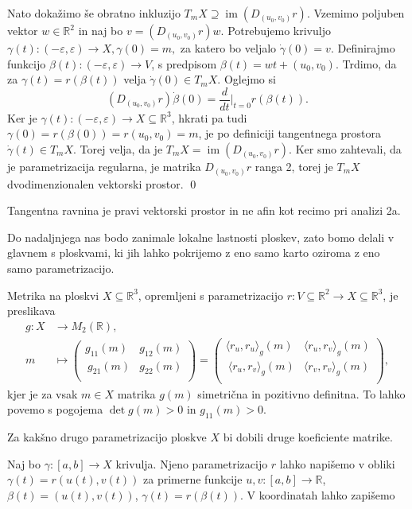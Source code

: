 Nato dokažimo še obratno inkluzijo $T_mX \supseteq
\operatorname{im} \left( D_{(u_0, v_0)}r \right)$. Vzemimo poljuben
vektor $w \in \mathbb{R}^2$ in naj bo $v = \left( D_{(u_0, v_0)} r \right) w$. Potrebujemo krivuljo $\gamma(t) : (-\varepsilon, \varepsilon) \to  X,
\gamma(0) = m,$ za katero bo veljalo $\dot{\gamma} (0) = v.$  Definirajmo funkcijo $\beta(t): (-\varepsilon, \varepsilon) \to V$,
s predpisom $\beta(t) = wt + (u_0, v_0)$. Trdimo, da za $\gamma(t) =
r(\beta(t))$  velja $\dot{\gamma}(0) \in  T_mX.$
Oglejmo si \begin{equation*} \left( D_{(u_0, v_0)}r \right)\dot{\beta} (0) =
\frac{d}{dt} \big|_{t = 0} r(\beta(t)). \end{equation*}   Ker je $\gamma(t): (-\varepsilon,
\varepsilon)\to  X \subseteq \mathbb{R}^3$, hkrati pa tudi $\gamma(0) = r(\beta(0) )= r(u_0, v_0) = m$, je po definiciji tangentnega prostora $\dot{\gamma}(t) \in T_mX$. Torej velja,
da je $T_mX = \operatorname{im}(D_{(u_0,v_0)}r)$. Ker smo zahtevali,
da je parametrizacija regularna, je matrika $D_{(u_0,v_0)}r$ ranga 2,
torej je  $T_mX$ dvodimenzionalen vektorski prostor.
\qed

\begin{opomba}
 Tangentna ravnina je pravi vektorski prostor in ne afin kot
 recimo pri analizi 2a.
\end{opomba}

Do nadaljnjega nas bodo zanimale lokalne lastnosti ploskev, zato bomo
delali v glavnem s ploskvami, ki jih lahko pokrijemo z eno samo karto
oziroma z eno samo parametrizacijo.

\begin{definicija}
\label{def_metrika_na_ploskvi}
 Metrika na ploskvi $X \subseteq  \mathbb{R}^3$, opremljeni s
 parametrizacijo $r: V \subseteq  \mathbb{R}^2 \to  X \subseteq
 \mathbb{R}^3$, je preslikava \begin{align*}
 	g: X &\longrightarrow M_2(\mathbb{R}), \\
 	m &\longmapsto 
	\begin{pmatrix}
		g_{11}(m) & g_{12}(m) \\\
		g_{21}(m) & g_{22}(m) \\
	\end{pmatrix} = \begin{pmatrix}
		\langle r_u, r_u \rangle_g (m) & \langle r_u, r_v \rangle_g(m) \\\
		\langle r_u, r_v \rangle_g(m) & \langle r_v, r_v \rangle_g(m) \\
	\end{pmatrix},
 \end{align*}
 kjer je za vsak $m \in  X$ matrika $g(m)$ simetrična in pozitivno definitna. To lahko povemo s pogojema
 $\det g(m) > 0$ in $g_{11}(m) >0.$

\end{definicija}
\begin{opomba}
 Za kakšno drugo parametrizacijo ploskve $X$ bi dobili druge koeficiente
 matrike.
\end{opomba}
 Naj bo $\gamma: [a,b] \to  X$ krivulja. Njeno parametrizacijo $r$
lahko napišemo v obliki  $\gamma(t) = r(u(t), v(t))$ za primerne
funkcije $u,v : [a,b] \to \mathbb{R}$, $\beta(t) = (u(t), v(t))$,
$\gamma(t) = r(\beta(t)).$ V koordinatah lahko zapišemo 

